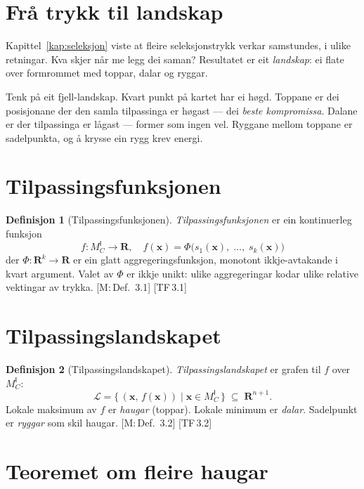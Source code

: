 \documentclass[10pt]{book}
\theoremstyle{definition}
\newtheorem{definisjon}{Definisjon}[chapter]
\theoremstyle{plain}
\theoremstyle{remark}
\newcommand{\MC}{M^{\mathsf{I}}_C}
\providecommand{\R}{}
\renewcommand{\R}{\mathbf{R}}
\newcommand{\FitLand}{\mathcal{L}}
\newcommand{\TF}[1]{\textnormal{[TF\,#1]}}
\newcommand{\Mref}[1]{\textnormal{[M:\,#1]}}
\begin{document}
\section{Fr\aa{} trykk til landskap}\label{sec:landskap:intuisjon}

Kapittel~\ref{kap:seleksjon} viste at fleire seleksjonstrykk verkar samstundes, i ulike retningar. Kva skjer n\aa r me legg dei saman? Resultatet er eit \emph{landskap}: ei flate over formrommet med toppar, dalar og ryggar.

Tenk p\aa{} eit fjell-landskap. Kvart punkt p\aa{} kartet har ei h\o gd. Toppane er dei posisjonane der den samla tilpassinga er h\o gast --- dei \emph{beste kompromissa}. Dalane er der tilpassinga er l\aa gast --- former som ingen vel. Ryggane mellom toppane er sadelpunkta, og \aa{} krysse ein rygg krev energi.

\section{Tilpassingsfunksjonen}\label{sec:landskap:funksjon}

\begin{definisjon}[Tilpassingsfunksjonen]\label{def:tilpassing}
\emph{Tilpassingsfunksjonen} er ein kontinuerleg funksjon
\[
  f : \MC \longrightarrow \R, \quad
  f(\bm{x}) = \Phi\bigl(s_1(\bm{x}),\; \ldots,\; s_k(\bm{x})\bigr)
\]
der $\Phi : \R^k \to \R$ er ein glatt aggregeringsfunksjon, monotont ikkje-avtakande i kvart argument. Valet av $\Phi$ er ikkje unikt: ulike aggregeringar kodar ulike relative vektingar av trykka. \Mref{Def.~3.1} \TF{3.1}
\end{definisjon}

\section{Tilpassingslandskapet}\label{sec:landskap:def}

\begin{definisjon}[Tilpassingslandskapet]\label{def:landskap}
\emph{Tilpassingslandskapet} er grafen til $f$ over $\MC$:
\[
  \FitLand = \bigl\{\, (\bm{x},\, f(\bm{x})) \;\big|\; \bm{x} \in \MC \,\bigr\} \;\subseteq\; \R^{n+1}.
\]
Lokale maksimum av $f$ er \emph{haugar} (toppar). Lokale minimum er \emph{dalar}. Sadelpunkt er \emph{ryggar} som skil haugar. \Mref{Def.~3.2} \TF{3.2}
\end{definisjon}

\section{Teoremet om fleire haugar}\label{sec:landskap:haugar}
\end{document}
